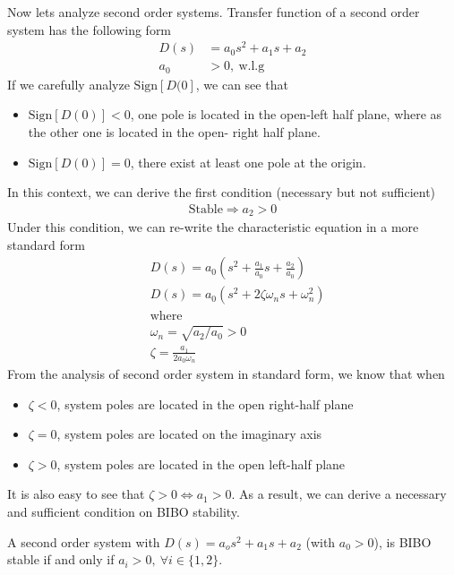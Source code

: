 \documentclass[twoside]{article}
\begin{document}
Now lets analyze second order systems. Transfer function
of a second order system has the following form
%
\begin{align*}
  D(s) &= a_0 s^2 + a_1 s + a_2\\
 a_0 &> 0 , \ \mathrm{w.l.g}
\end{align*}
%
If we carefully analyze $\mathrm{Sign} [ D(0 ]$, 
we can see that
%
\begin{itemize}
     \item $\mathrm{Sign} [ D(0) ] < 0$, one pole is located in the
       open-left half plane, where as the other one is located in the
       open- right half plane.
     \item $\mathrm{Sign} [ D(0) ] = 0$, there exist at least one pole 
     at the origin.
\end{itemize}
%
In this context, we can derive the first condition (necessary but not
sufficient) 
%
\begin{align*}
 \mathrm{Stable} \Rightarrow a_2 > 0 
\end{align*}
%
Under this condition, we can re-write the characteristic
equation in a more standard form
%
\begin{align*}
  &D(s) = a_0 \left( s^2 + \frac{a_1}{a_0} s + \frac{a_2}{a_0} \right)
  \\
  &D(s) = a_0 \left( s^2 + 2 \zeta \omega_n s + \omega_n^2 \right)
  \\
  &\mathrm{where}
\\
 &\omega_n = \sqrt{a_2 / a_0} > 0 
\\
  &\zeta = \frac{a_1}{2 a_0 \omega_n} 
\end{align*}
%
From the analysis of second order system in standard form,
we know that when 
%
\begin{itemize}
  \item $\zeta < 0$, system poles are located in the open right-half
    plane
  \item $\zeta = 0$, system poles are located on the imaginary axis
  \item $\zeta > 0$, system poles are located in the open left-half
    plane
\end{itemize}
%
It is also easy to see that $\zeta > 0 \Leftrightarrow a_1 > 0$. 
As a result, we can derive a necessary and sufficient condition on
BIBO stability. 

A second order system with $D(s) = a_o s^2 + a_1 s + a_2$ (with $a_0 >
0$), is BIBO stable if and only if $a_i > 0, \ \forall i \in \lbrace 1
, 2 \rbrace$.
\end{document}
